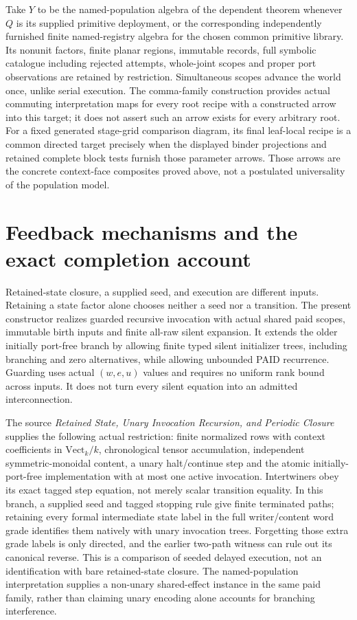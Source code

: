 \documentclass[11pt]{article}
\begin{document}
Take $Y$ to be the named-population algebra of the dependent theorem whenever $Q$ is its supplied primitive deployment, or the corresponding independently furnished finite named-registry algebra for the chosen common primitive library. Its nonunit factors, finite planar regions, immutable records, full symbolic catalogue including rejected attempts, whole-joint scopes and proper port observations are retained by restriction. Simultaneous scopes advance the world once, unlike serial execution. The comma-family construction provides actual commuting interpretation maps for every root recipe with a constructed arrow into this target; it does not assert such an arrow exists for every arbitrary root. For a fixed generated stage-grid comparison diagram, its final leaf-local recipe is a common directed target precisely when the displayed binder projections and retained complete block tests furnish those parameter arrows. Those arrows are the concrete context-face composites proved above, not a postulated universality of the population model.

\section{Feedback mechanisms and the exact completion account}
Retained-state closure, a supplied seed, and execution are different inputs. Retaining a state factor alone chooses neither a seed nor a transition. The present constructor realizes guarded recursive invocation with actual shared paid scopes, immutable birth inputs and finite all-raw silent expansion. It extends the older initially port-free branch by allowing finite typed silent initializer trees, including branching and zero alternatives, while allowing unbounded PAID recurrence. Guarding uses actual $(w,e,u)$ values and requires no uniform rank bound across inputs. It does not turn every silent equation into an admitted interconnection.

The source \emph{Retained State, Unary Invocation Recursion, and Periodic Closure} supplies the following actual restriction: finite normalized rows with context coefficients in $\mathrm{Vect}_k/k$, chronological tensor accumulation, independent symmetric-monoidal content, a unary halt/continue step and the atomic initially-port-free implementation with at most one active invocation. Intertwiners obey its exact tagged step equation, not merely scalar transition equality. In this branch, a supplied seed and tagged stopping rule give finite terminated paths; retaining every formal intermediate state label in the full writer/content word grade identifies them natively with unary invocation trees. Forgetting those extra grade labels is only directed, and the earlier two-path witness can rule out its canonical reverse. This is a comparison of seeded delayed execution, not an identification with bare retained-state closure. The named-population interpretation supplies a non-unary shared-effect instance in the same paid family, rather than claiming unary encoding alone accounts for branching interference.
\end{document}

